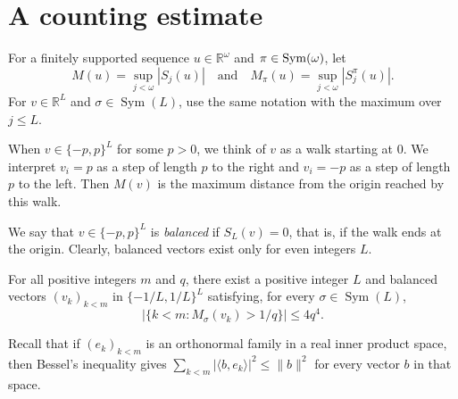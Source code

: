 \section{A counting estimate}\label{sec:finite}

For a finitely supported sequence $u\in\mathbb R^\omega$ and
$\pi\in\operatorname{Sym}(\omega)$, let
\[
 M(u)=\sup_{j<\omega}\left|S_j(u)\right| \quad \text{and}\quad
 M_\pi(u)=\sup_{j<\omega}\left|S_j^\pi(u)\right|.
\]
For $v\in\mathbb R^L$ and $\sigma\in\operatorname{Sym}(L)$, use
the same notation with the maximum over $j\leq L$.

When $v\in \{-p, p\}^L$ for some $p>0$, we think of $v$ as a walk starting at $0$.
We interpret $v_i=p$ as a step of length $p$ to the right and $v_i=-p$ as a step of length $p$ to the left.
Then $M(v)$ is the maximum distance from the origin reached by this walk.

We say that $v \in \{-p, p\}^L$ is \emph{balanced} if $S_L(v)=0$, that is, if the walk ends at the origin.
Clearly, balanced vectors exist only for even integers $L$.

\begin{lemma}\label{lem:finite}
For all positive integers $m$ and $q$,
there exist a positive integer $L$ and balanced vectors
$(v_k)_{k<m}$ in $\{-1/L,1/L\}^L$ satisfying, for every $\sigma\in\operatorname{Sym}(L)$,
\begin{equation*}
 \left|\{k<m:M_\sigma(v_k)>1/q\}\right|\leq 4q^4.
\end{equation*}
\end{lemma}

Recall that if $(e_k)_{k<m}$ is an orthonormal family in a real
inner product space, then Bessel's inequality gives
$\sum_{k<m}|\langle b,e_k\rangle|^2\leq\|b\|^2$ for every vector $b$
in that space.

